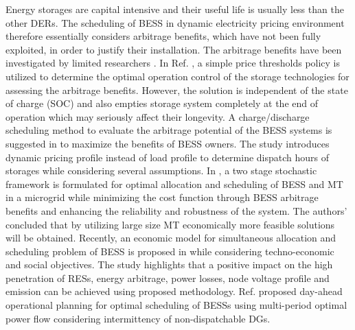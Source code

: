 \documentclass[journal]{IEEEtran}
\begin{document}
\par Energy storages are capital intensive and their useful life is usually less than the other DERs. The scheduling of BESS in dynamic electricity pricing environment therefore essentially considers arbitrage benefits, which have not been fully exploited, in order to justify their installation.  The arbitrage benefits have been investigated by limited researchers \cite{6345242,en9010012,8353004,JANNESAR2018957,en12071231}. In Ref. \cite{6345242}, a simple price thresholds policy is utilized to determine the optimal operation control of the storage technologies for assessing the arbitrage benefits. However, the solution is independent of the state of charge (SOC) and also empties storage system completely at the end of operation which may seriously affect their longevity. A charge/discharge scheduling method to evaluate the arbitrage potential of the BESS systems is suggested in \cite{en9010012} to maximize the benefits of BESS owners. The study introduces dynamic pricing profile instead of load profile to determine dispatch hours of storages while considering several assumptions. In \cite{8353004}, a two stage stochastic framework is formulated for optimal allocation and scheduling of BESS and MT in a microgrid while minimizing the cost function through BESS arbitrage benefits and enhancing the reliability and robustness of the system. The authors' concluded that by utilizing large size MT economically more feasible solutions will be obtained. Recently, an economic model for simultaneous allocation and scheduling problem of BESS is proposed in \cite{JANNESAR2018957} while considering techno-economic and social objectives. The study highlights that a positive impact on the high penetration of RESs, energy arbitrage, power losses, node voltage profile and emission can be achieved using proposed methodology. Ref. \cite{en12071231} proposed day-ahead operational planning for optimal scheduling of BESSs using multi-period optimal power flow considering intermittency of non-dispatchable DGs.
%	
\end{document}
